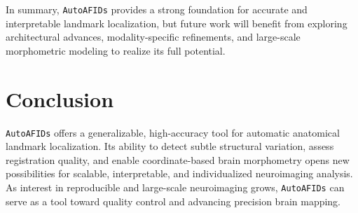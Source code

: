 In summary, \texttt{AutoAFIDs} provides a strong foundation for accurate and interpretable landmark localization, but future work will benefit from exploring architectural advances, modality-specific refinements, and large-scale morphometric modeling to realize its full potential.

\section{Conclusion}

\texttt{AutoAFIDs} offers a generalizable, high-accuracy tool for automatic anatomical landmark localization. Its ability to detect subtle structural variation, assess registration quality, and enable coordinate-based brain morphometry opens new possibilities for scalable, interpretable, and individualized neuroimaging analysis. As interest in reproducible and large-scale neuroimaging grows, \texttt{AutoAFIDs} can serve as a tool toward quality control and advancing precision brain mapping.



